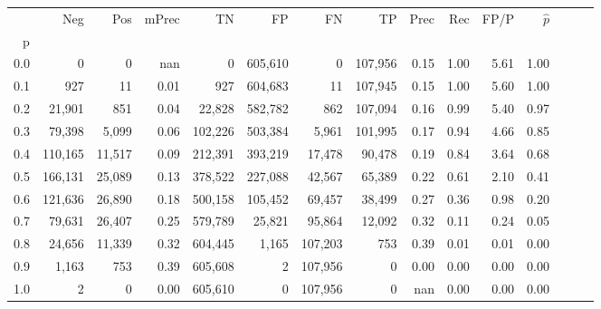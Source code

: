 \begin{tabular}{rrrrrrrrrrrrrrr}
\toprule
{} &      Neg &     Pos & mPrec &       TN &       FP &       FN &       TP &  Prec &   Rec &  FP/P & $\hat{p}$ \\
p   &          &         &       &          &          &          &          &       &       &       &           \\
\midrule
0.0 &        0 &       0 &   nan &        0 &  605,610 &        0 &  107,956 &  0.15 &  1.00 &  5.61 &      1.00 \\
0.1 &      927 &      11 &  0.01 &      927 &  604,683 &       11 &  107,945 &  0.15 &  1.00 &  5.60 &      1.00 \\
0.2 &   21,901 &     851 &  0.04 &   22,828 &  582,782 &      862 &  107,094 &  0.16 &  0.99 &  5.40 &      0.97 \\
0.3 &   79,398 &   5,099 &  0.06 &  102,226 &  503,384 &    5,961 &  101,995 &  0.17 &  0.94 &  4.66 &      0.85 \\
0.4 &  110,165 &  11,517 &  0.09 &  212,391 &  393,219 &   17,478 &   90,478 &  0.19 &  0.84 &  3.64 &      0.68 \\
0.5 &  166,131 &  25,089 &  0.13 &  378,522 &  227,088 &   42,567 &   65,389 &  0.22 &  0.61 &  2.10 &      0.41 \\
0.6 &  121,636 &  26,890 &  0.18 &  500,158 &  105,452 &   69,457 &   38,499 &  0.27 &  0.36 &  0.98 &      0.20 \\
0.7 &   79,631 &  26,407 &  0.25 &  579,789 &   25,821 &   95,864 &   12,092 &  0.32 &  0.11 &  0.24 &      0.05 \\
0.8 &   24,656 &  11,339 &  0.32 &  604,445 &    1,165 &  107,203 &      753 &  0.39 &  0.01 &  0.01 &      0.00 \\
0.9 &    1,163 &     753 &  0.39 &  605,608 &        2 &  107,956 &        0 &  0.00 &  0.00 &  0.00 &      0.00 \\
1.0 &        2 &       0 &  0.00 &  605,610 &        0 &  107,956 &        0 &   nan &  0.00 &  0.00 &      0.00 \\
\bottomrule
\end{tabular}
